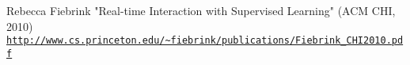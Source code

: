 \documentclass[a4paper, 11pt]{article}
\begin{document}




  \begin{thebibliography}{9}
      Rebecca Fiebrink "Real-time Interaction with Supervised Learning" (ACM CHI, 2010)
      \\\texttt{\url{http://www.cs.princeton.edu/~fiebrink/publications/Fiebrink_CHI2010.pdf}}
  \end{thebibliography}

  
\end{document}
